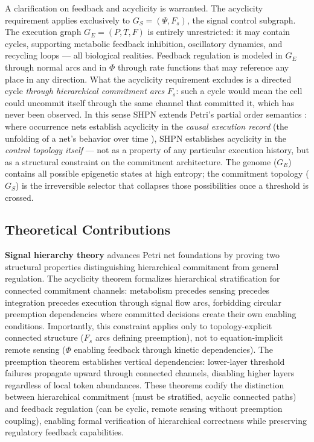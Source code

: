 \documentclass[10pt,letterpaper]{article}
\providecommand{\DIFaddtex}[1]{{\protect\color{blue}\uwave{#1}}} %
\providecommand{\DIFdeltex}[1]{{\protect\color{red}\sout{#1}}}                      %
\providecommand{\DIFaddbegin}{} %
\providecommand{\DIFaddend}{} %
\providecommand{\DIFdelbegin}{} %
\providecommand{\DIFdelend}{} %
\providecommand{\DIFadd}[1]{\texorpdfstring{\DIFaddtex{#1}}{#1}} %
\providecommand{\DIFdel}[1]{\texorpdfstring{\DIFdeltex{#1}}{}} %
\newcommand{\DIFscaledelfig}{0.5}
\newlength{\DIFdelgraphicswidth} %
\newlength{\DIFdelgraphicsheight} %
\newcommand{\DIFaddincludegraphics}[2][]{{\color{blue}\fbox{\DIFOincludegraphics[#1]{#2}}}} %
\newcommand{\DIFdelincludegraphics}[2][]{%
\sbox{\DIFdelgraphicsbox}{\DIFOincludegraphics[#1]{#2}}%
\settoboxwidth{\DIFdelgraphicswidth}{\DIFdelgraphicsbox} %
\settoboxtotalheight{\DIFdelgraphicsheight}{\DIFdelgraphicsbox} %
\scalebox{\DIFscaledelfig}{%
\parbox[b]{\DIFdelgraphicswidth}{\usebox{\DIFdelgraphicsbox}\\[-\baselineskip] \rule{\DIFdelgraphicswidth}{0em}}\llap{\resizebox{\DIFdelgraphicswidth}{\DIFdelgraphicsheight}{%
\setlength{\unitlength}{\DIFdelgraphicswidth}%
\begin{picture}(1,1)%
\thicklines\linethickness{2pt} %
{\color[rgb]{1,0,0}\put(0,0){\framebox(1,1){}}}%
{\color[rgb]{1,0,0}\put(0,0){\line( 1,1){1}}}%
{\color[rgb]{1,0,0}\put(0,1){\line(1,-1){1}}}%
\end{picture}%
}\hspace*{3pt}}} %
} %
\DeclareRobustCommand{\DIFaddbegin}{\DIFOaddbegin \let\includegraphics\DIFaddincludegraphics} %
\DeclareRobustCommand{\DIFaddend}{\DIFOaddend \let\includegraphics\DIFOincludegraphics} %
\DeclareRobustCommand{\DIFdelbegin}{\DIFOdelbegin \let\includegraphics\DIFdelincludegraphics} %
\DeclareRobustCommand{\DIFdelend}{\DIFOaddend \let\includegraphics\DIFOincludegraphics} %
\begin{document}
A clarification on feedback and acyclicity is warranted. The acyclicity
requirement applies exclusively to \DIFdelbegin \DIFdel{$G_S = (\Psi, F_s)$}\DIFdelend \DIFaddbegin \DIFadd{$G_s = (\Psi, F_s)$}\DIFaddend , the signal control
subgraph. The execution graph $G_E = (P, T, F)$ is entirely unrestricted: it
may contain cycles, supporting metabolic feedback inhibition, oscillatory
dynamics, and recycling loops --- all biological realities. Feedback regulation
is modeled in $G_E$ through normal arcs and in $\Phi$ through rate functions
that may reference any place in any direction. What the acyclicity requirement
excludes is a directed cycle \textit{through hierarchical commitment arcs}
$F_s$: such a cycle would mean the cell could uncommit itself through the
same channel that committed it, which has never been observed. In this sense
SHPN extends Petri's partial order semantics \cite{nielsen1981}: where
occurrence nets establish acyclicity in the \textit{causal execution record}
(the unfolding of a net's behavior over time \cite{winskel1987}), SHPN
establishes acyclicity in the \textit{control topology itself} --- not as a
property of any particular execution history, but as a structural constraint
on the commitment architecture. The genome ($G_E$) contains all possible
epigenetic states at high entropy; the commitment topology (\DIFdelbegin \DIFdel{$G_S$}\DIFdelend \DIFaddbegin \DIFadd{$G_s$}\DIFaddend ) is the
irreversible selector that collapses those possibilities once a threshold is
crossed.

\subsection{Theoretical Contributions}

\textbf{Signal hierarchy theory} advances Petri net foundations by proving two structural properties distinguishing hierarchical commitment from general regulation. The acyclicity theorem formalizes hierarchical stratification for connected commitment channels: metabolism precedes sensing precedes integration precedes execution through signal flow arcs, forbidding circular preemption dependencies where committed decisions create their own enabling conditions. Importantly, this constraint applies only to topology-explicit connected structure ($F_s$ arcs defining preemption), not to equation-implicit remote sensing ($\Phi$ enabling feedback through kinetic dependencies). The preemption theorem establishes vertical dependencies: lower-layer threshold failures propagate upward through connected channels, disabling higher layers regardless of local token abundances. These theorems codify the distinction between hierarchical commitment (must be stratified, acyclic connected paths) and feedback regulation (can be cyclic, remote sensing without preemption coupling), enabling formal verification of hierarchical correctness while preserving regulatory feedback capabilities.
\end{document}
